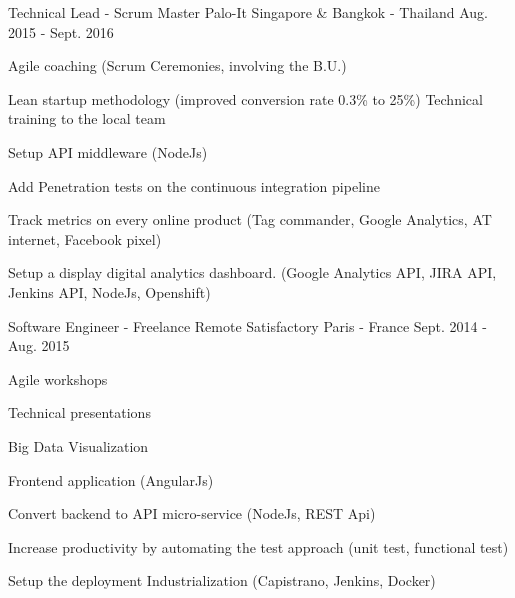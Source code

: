 \begin{cventries}
  \cventry
    {Technical Lead - Scrum Master} %
    {Palo-It} %
    {Singapore \& Bangkok - Thailand} %
    {Aug. 2015 - Sept. 2016} %
    {
      \begin{cvitems} %
        \item {Agile coaching (Scrum Ceremonies, involving the B.U.)}
        \item {Lean startup methodology (improved conversion rate 0.3\% to 25\%) Technical training to the local team}
        \item {Setup API middleware (NodeJs)}
        \item {Add Penetration tests on the continuous integration pipeline}
        \item {Track metrics on every online product (Tag commander, Google Analytics, AT internet, Facebook pixel)}
        \item {Setup a display digital analytics dashboard. (Google Analytics API, JIRA API, Jenkins API, NodeJs, Openshift)}
      \end{cvitems}
    }

  \cventry
    {Software Engineer - Freelance Remote} %
    {Satisfactory} %
    {Paris - France} %
    {Sept. 2014 - Aug. 2015} %
    {
      \begin{cvitems} %
        \item {Agile workshops}
        \item {Technical presentations}
        \item {Big Data Visualization}
        \item {Frontend application (AngularJs)}
        \item {Convert backend to API micro-service (NodeJs, REST Api)}
        \item {Increase productivity by automating the test approach (unit test, functional test)}
        \item {Setup the deployment Industrialization (Capistrano, Jenkins, Docker)}
      \end{cvitems}
    }


\end{cventries}
